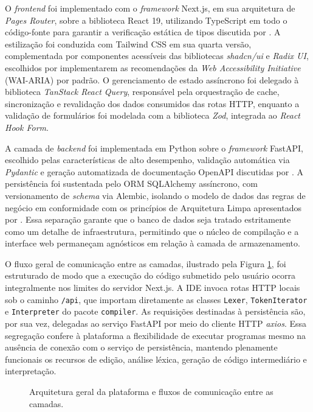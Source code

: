 O \textit{frontend} foi implementado com o \textit{framework} Next.js, em sua arquitetura de \textit{Pages Router}, sobre a biblioteca React 19, utilizando TypeScript em todo o código-fonte para garantir a verificação estática de tipos discutida por . A estilização foi conduzida com Tailwind CSS em sua quarta versão, complementada por componentes acessíveis das bibliotecas \textit{shadcn/ui} e \textit{Radix UI}, escolhidos por implementarem as recomendações da \textit{Web Accessibility Initiative} (WAI-ARIA) por padrão. O gerenciamento de estado assíncrono foi delegado à biblioteca \textit{TanStack React Query}, responsável pela orquestração de cache, sincronização e revalidação dos dados consumidos das rotas HTTP, enquanto a validação de formulários foi modelada com a biblioteca \textit{Zod}, integrada ao \textit{React Hook Form}.

A camada de \textit{backend} foi implementada em Python sobre o \textit{framework} FastAPI, escolhido pelas características de alto desempenho, validação automática via \textit{Pydantic} e geração automatizada de documentação OpenAPI discutidas por . A persistência foi sustentada pelo ORM SQLAlchemy assíncrono, com versionamento de \textit{schema} via Alembic, isolando o modelo de dados das regras de negócio em conformidade com os princípios de Arquitetura Limpa apresentados por . Essa separação garante que o banco de dados seja tratado estritamente como um detalhe de infraestrutura, permitindo que o núcleo de compilação e a interface web permaneçam agnósticos em relação à camada de armazenamento.

O fluxo geral de comunicação entre as camadas, ilustrado pela Figura \ref{fig:arquitetura-plataforma}, foi estruturado de modo que a execução do código submetido pelo usuário ocorra integralmente nos limites do servidor Next.js. A IDE invoca rotas HTTP locais sob o caminho \texttt{/api}, que importam diretamente as classes \texttt{Lexer}, \texttt{TokenIterator} e \texttt{Interpreter} do pacote \texttt{compiler}. As requisições destinadas à persistência são, por sua vez, delegadas ao serviço FastAPI por meio do cliente HTTP \textit{axios}. Essa segregação confere à plataforma a flexibilidade de executar programas mesmo na ausência de conexão com o serviço de persistência, mantendo plenamente funcionais os recursos de edição, análise léxica, geração de código intermediário e interpretação.

\begin{figure}[H]
    \centering
    \caption{Arquitetura geral da plataforma e fluxos de comunicação entre as camadas.}
    \label{fig:arquitetura-plataforma}
\end{figure}

